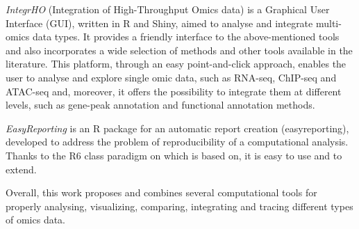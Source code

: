 {\textit{IntegrHO} (Integration of High-Throughput Omics data) is a Graphical User Interface (GUI), written in R and Shiny, aimed to analyse and integrate multi-omics data types. It provides a friendly interface to the above-mentioned tools and also incorporates a wide selection of methods and other tools available in the literature. This platform, through an easy point-and-click approach, enables the user to analyse and explore single omic data, such as RNA-seq, ChIP-seq and ATAC-seq and, moreover, it offers the possibility to integrate them at different levels, such as gene-peak annotation and functional annotation methods.

\textit{EasyReporting} is an R package for an automatic report creation (easyreporting), developed to address the problem of reproducibility of a computational analysis.  
Thanks to the R6 class paradigm on which is based on, it is easy to use and to extend.

Overall, this work proposes and combines several computational tools for properly analysing, visualizing, comparing, integrating and tracing different types of omics data.
}